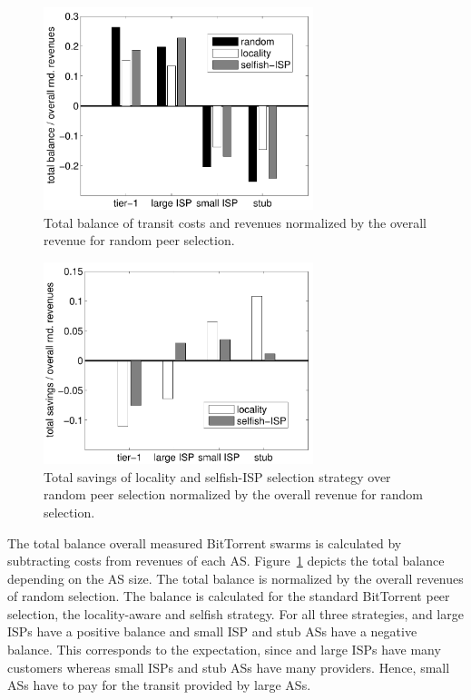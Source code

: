 \begin{figure}[bt]
	\centering
	\includegraphics[width=0.7\textwidth]{aslevel/p2p/results/figs/total_balance}
 	\caption{Total balance of transit costs and revenues normalized by the overall revenue for random peer selection.}
 	\label{fig:total_balance}
\end{figure}

\begin{figure}[bt]
	\centering
	\includegraphics[width=0.7\textwidth]{aslevel/p2p/results/figs/savings}
 	\caption{Total savings of locality and selfish-ISP selection strategy over random peer selection normalized by the overall revenue for random selection.}
 	\label{fig:savings}
\end{figure}

The total balance overall measured BitTorrent swarms is calculated by subtracting costs from revenues of each AS. Figure~\ref{fig:total_balance} depicts the total balance depending on the AS size. The total balance is normalized by the overall revenues of random selection. The balance is calculated for the standard BitTorrent peer selection, the locality-aware and selfish strategy.
For all three strategies, \tier and large ISPs have a positive balance and small ISP and stub ASs have a negative balance. This corresponds to the expectation, since \tier and large ISPs have many customers whereas small ISPs and stub ASs have many providers. Hence, small ASs have to pay for the transit provided by large ASs.

